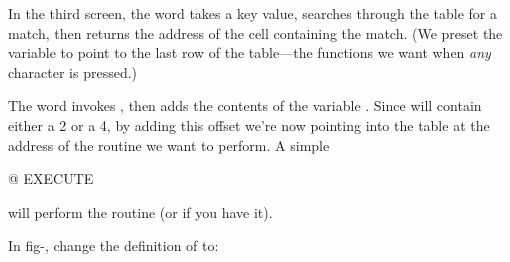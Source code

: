 In the third screen, the word  takes a key value,
searches through the  table for a match, then returns the
address of the cell containing the match. (We preset the variable
 to point to the last row of the table---the functions we want
when \emph{any} character is pressed.)

The word  invokes , then adds the contents of
the variable . Since  will contain either a 2 or a 4, by
adding this offset we're now pointing into the table at the address
of the routine we want to perform. A simple

\begin{Code}
@ EXECUTE
\end{Code}
will perform the routine (or  if you have it).

In fig-\Forth{}, change the definition of  to:

